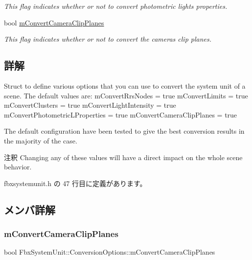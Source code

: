 \begin{DoxyCompactItemize}
\begin{DoxyCompactList}\small\item\em This flag indicates whether or not to convert photometric lights properties. \end{DoxyCompactList}\item 
bool \hyperlink{struct_fbx_system_unit_1_1_conversion_options_aed0a5ea01f2e171bfbd8d934f6556fe4}{m\+Convert\+Camera\+Clip\+Planes}
\begin{DoxyCompactList}\small\item\em This flag indicates whether or not to convert the cameras clip planes. \end{DoxyCompactList}\end{DoxyCompactItemize}


\subsection{詳解}
Struct to define various options that you can use to convert the system unit of a scene. The default values are\+: m\+Convert\+Rrs\+Nodes = true m\+Convert\+Limits = true m\+Convert\+Clusters = true m\+Convert\+Light\+Intensity = true m\+Convert\+Photometric\+L\+Properties = true m\+Convert\+Camera\+Clip\+Planes = true

The default configuration have been tested to give the best conversion results in the majority of the case. \begin{DoxyRemark}{注釈}
Changing any of these values will have a direct impact on the whole scene behavior. 
\end{DoxyRemark}


 fbxsystemunit.\+h の 47 行目に定義があります。



\subsection{メンバ詳解}
\mbox{\label{struct_fbx_system_unit_1_1_conversion_options_aed0a5ea01f2e171bfbd8d934f6556fe4}} 
\subsubsection{\texorpdfstring{m\+Convert\+Camera\+Clip\+Planes}{mConvertCameraClipPlanes}}
{\footnotesize\ttfamily bool Fbx\+System\+Unit\+::\+Conversion\+Options\+::m\+Convert\+Camera\+Clip\+Planes}



